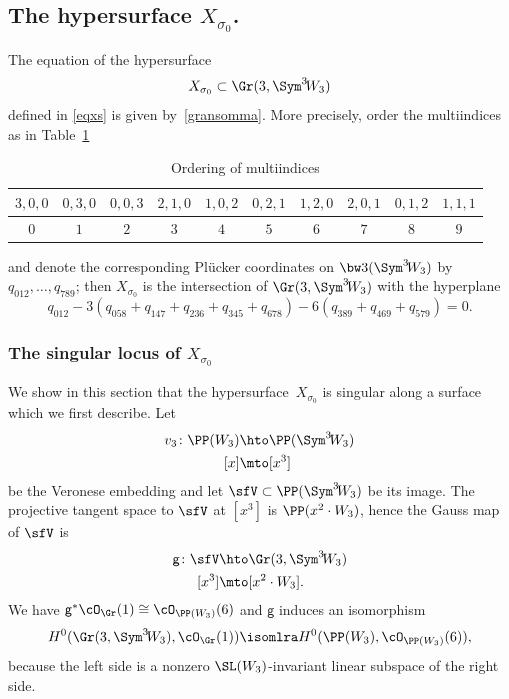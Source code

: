 \subsection{The hypersurface $X_{\sigma_0}$.}\label{effezero}

The equation of the hypersurface
\[
X_{\sigma_0}\subset \Gr(3,\Sym^3\! W_{3})
\]
defined in \eqref{eqxs} is given by~\eqref{gransomma}. More precisely, order the multiindices as in
Table~\ref{enumero}
\begin{table}[htb!]
\renewcommand\arraystretch{1.5}
\begin{tabular}{| c | c | c | c | c | c | c | c | c | c |}
\hline
$ 3,0,0$ & $ 0,3,0$ & $ 0,0,3$ & $ 2,1,0$ & $ 1,0,2$ & $ 0,2,1$ & $ 1,2,0$ &
$ 2,0,1$ & $ 0,1,2$ & $ 1,1,1$ \\
\hline
$ 0$ & $ 1$ & $ 2$ & $ 3$ & $ 4$ & $ 5$ & $ 6$ & $ 7$ &
$ 8$ & $ 9$ \\
\hline
\end{tabular}
\vspace{\baselineskip}
\caption{Ordering of multiindices}\label{enumero}
\vspace{-\baselineskip}
\end{table}
and denote the corresponding Plücker coordinates on $\bw3(\Sym^3\! W_{3})$ by $q_{012},\ldots,q_{789}$; then $X_{\sigma_0}$ is the intersection of $\Gr(3,\Sym^3\! W_{3})$ with the hyperplane
\begin{equation}\label{tagliograss}
q_{012}- 3 (q_{058}+q_{147}+ q_{236}+q_{345}+q_{678})-6(q_{389}+q_{469}+q_{579})=0.
\end{equation}

\subsubsection{The singular locus of $X_{\sigma_0}$}

We show in this section that the hypersurface~$X_{\sigma_0}$ is singular along a surface which we first describe. Let
\begin{align*}
v_3\colon\PP(W_3) & \hto \PP(\Sym^3\! W_3) \\
{[}x] & \mto [x^3]
\end{align*}
be the Veronese embedding and let $\sfV\subset\PP(\Sym^3\! W_3)$ be its image. The projective tangent space to $\sfV$ at $[x^3]$
is $\PP(x^2\cdot W_3)$, hence the Gauss map of $\sfV$ is
\begin{equation}
\begin{split}\label{mappagauss}
{\mathsf g}\colon \sfV & \hto \Gr(3,\Sym^3\! W_3) \\
{[}x^3] & \mto [x^2\cdot W_3].
\end{split}
\end{equation}
We have ${\mathsf g}^{*}\cO_{\Gr}(1)\cong \cO_{\PP(W_3)}(6)$ and ${\mathsf g}$ induces an isomorphism
\begin{equation}\label{isomo}
H^0(\Gr(3,\Sym^3\! W_3),\cO_{\Gr}(1))\isomlra H^0(\PP(W_3),\cO_{\PP(W_3)}(6)),
\end{equation}
because the left side
is a nonzero $\SL(W_3)$-invariant linear subspace of the right side.

